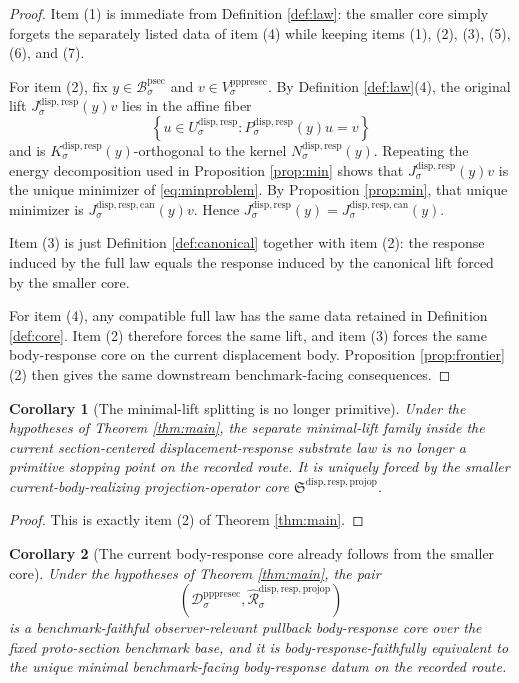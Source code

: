 \documentclass[11pt]{article}
\newcommand{\ProtoSectionBody}[1]{\mathcal B_{#1}^{\mathrm{psec}}}
\newcommand{\PrePreProtoSectionVertical}[1]{V_{#1}^{\mathrm{pppresec}}}
\newcommand{\PrePreProtoSectionResidualBody}[1]{\mathcal D_{#1}^{\mathrm{pppresec}}}
\newcommand{\ProjectionOperatorCore}{\mathfrak S^{\mathrm{disp,resp,projop}}}
\newcommand{\SubstrateCarrier}[1]{U_{#1}^{\mathrm{disp,resp}}}
\newcommand{\SubstrateProjection}[1]{P_{#1}^{\mathrm{disp,resp}}}
\newcommand{\SubstrateOperator}[1]{K_{#1}^{\mathrm{disp,resp}}}
\newcommand{\SubstrateLift}[1]{J_{#1}^{\mathrm{disp,resp}}}
\newcommand{\CanonicalLift}[1]{J_{#1}^{\mathrm{disp,resp,can}}}
\newcommand{\SubstrateKernel}[1]{N_{#1}^{\mathrm{disp,resp}}}
\newcommand{\CoreForcedBodyResponse}[1]{\widehat{\mathscr R}_{#1}^{\mathrm{disp,resp,projop}}}
\newtheorem{corollary}{Corollary}
\begin{document}
\begin{proof}
Item (1) is immediate from Definition \ref{def:law}: the smaller core simply forgets the separately listed data of item (4) while keeping items (1), (2), (3), (5), (6), and (7).

For item (2), fix \(y\in\ProtoSectionBody{\sigma}\) and \(v\in\PrePreProtoSectionVertical{\sigma}\). By Definition \ref{def:law}(4), the original lift \(\SubstrateLift{\sigma}(y)v\) lies in the affine fiber
\[
\left\{
u\in\SubstrateCarrier{\sigma}:
\SubstrateProjection{\sigma}(y)u=v
\right\}
\]
and is \(\SubstrateOperator{\sigma}(y)\)-orthogonal to the kernel \(\SubstrateKernel{\sigma}(y)\). Repeating the energy decomposition used in Proposition \ref{prop:min} shows that \(\SubstrateLift{\sigma}(y)v\) is the unique minimizer of \eqref{eq:minproblem}. By Proposition \ref{prop:min}, that unique minimizer is \(\CanonicalLift{\sigma}(y)v\). Hence \(\SubstrateLift{\sigma}(y)=\CanonicalLift{\sigma}(y)\).

Item (3) is just Definition \ref{def:canonical} together with item (2): the response induced by the full law equals the response induced by the canonical lift forced by the smaller core.

For item (4), any compatible full law has the same data retained in Definition \ref{def:core}. Item (2) therefore forces the same lift, and item (3) forces the same body-response core on the current displacement body. Proposition \ref{prop:frontier}(2) then gives the same downstream benchmark-facing consequences.
\end{proof}

\begin{corollary}[The minimal-lift splitting is no longer primitive]
\label{cor:nonprimitive}
Under the hypotheses of Theorem \ref{thm:main}, the separate minimal-lift family inside the current section-centered displacement-response substrate law is no longer a primitive stopping point on the recorded route. It is uniquely forced by the smaller current-body-realizing projection-operator core \(\ProjectionOperatorCore\).
\end{corollary}

\begin{proof}
This is exactly item (2) of Theorem \ref{thm:main}.
\end{proof}

\begin{corollary}[The current body-response core already follows from the smaller core]
\label{cor:bodyresp}
Under the hypotheses of Theorem \ref{thm:main}, the pair
\[
\left(
\PrePreProtoSectionResidualBody{\sigma},
\CoreForcedBodyResponse{\sigma}
\right)
\]
is a benchmark-faithful observer-relevant pullback body-response core over the fixed proto-section benchmark base, and it is body-response-faithfully equivalent to the unique minimal benchmark-facing body-response datum on the recorded route.
\end{corollary}
\end{document}
